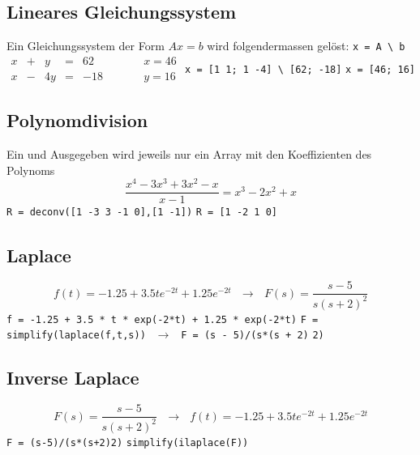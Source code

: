 \subsection{Lineares Gleichungssystem}
Ein Gleichungssystem der Form $ Ax = b $ wird folgendermassen gelöst: \newline
\verb?x = A \ b? \newline
  $ \begin{array}{ccccccc}
   x & + & y & = & 62 & ~~~~~~~~~ & x = 46 \\
   x & - & 4y & = & -18 & & y = 16
  \end{array} $
\hspace{5mm}
\hspace{10mm}
\verb?x = [1 1; 1 -4] \ [62; -18]? \hspace{5mm} \verb?x = [46; 16]?

\subsection{Polynomdivision}
Ein und Ausgegeben wird jeweils nur ein Array mit den Koeffizienten des Polynoms
\newline
$$ \frac{x^4 - 3x^3 + 3x^2 - x}{x-1} = x^3 - 2x^2 + x $$
\verb?R = deconv([1 -3 3 -1 0],[1 -1])? \hspace{5mm} \verb?R = [1 -2 1 0]?

\subsection{Laplace}
$$ f(t) = -1.25 + 3.5t e^{-2t} + 1.25 e^{-2t} ~~~ \rightarrow ~~~
F(s) = \frac{s-5}{s(s+2)^2} $$
\verb?f = -1.25 + 3.5 * t * exp(-2*t) + 1.25 * exp(-2*t)? \newline
\verb?F = simplify(laplace(f,t,s))? $ ~~ \rightarrow ~~ $
\verb?F = (s - 5)/(s*(s + 2)?\texttt{\hoch} \verb?2)?

\subsection{Inverse Laplace}
$$ F(s) = \frac{s-5}{s(s+2)^2} ~~~ \rightarrow ~~~ f(t) = -1.25 + 3.5t e^{-2t} +
1.25 e^{-2t} $$
\verb?F = (s-5)/(s*(s+2)?\texttt{\hoch}\verb?2)? \hspace{5mm}
\verb?simplify(ilaplace(F))?

